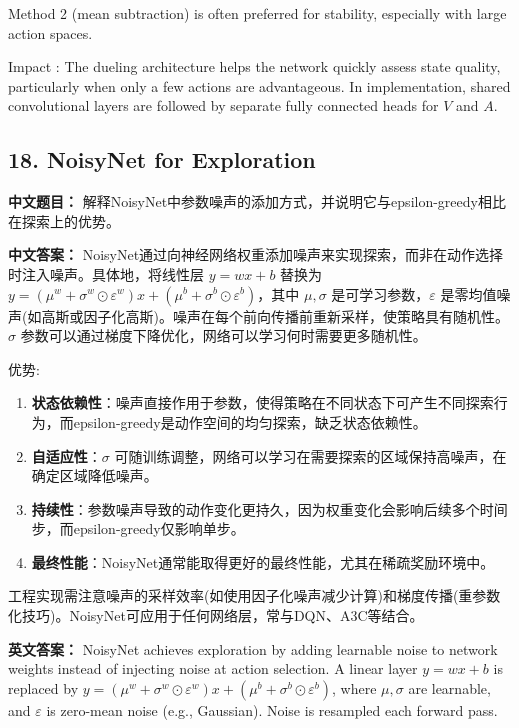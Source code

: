 \documentclass[10pt,a4paper]{ctexart}
\begin{document}
Method 2 (mean subtraction) is often preferred for stability, especially with large action spaces.

 Impact : The dueling architecture helps the network quickly assess state quality, particularly when only a few actions are advantageous. In implementation, shared convolutional layers are followed by separate fully connected heads for \(V\) and \(A\).

\subsection*{18. NoisyNet for Exploration}
\textbf{中文题目：} 解释NoisyNet中参数噪声的添加方式，并说明它与epsilon-greedy相比在探索上的优势。

\textbf{中文答案：}  
NoisyNet通过向神经网络权重添加噪声来实现探索，而非在动作选择时注入噪声。具体地，将线性层 \(y = wx + b\) 替换为 \(y = (\mu^w + \sigma^w \odot \varepsilon^w)x + (\mu^b + \sigma^b \odot \varepsilon^b)\)，其中 \(\mu, \sigma\) 是可学习参数，\(\varepsilon\) 是零均值噪声(如高斯或因子化高斯)。噪声在每个前向传播前重新采样，使策略具有随机性。\(\sigma\) 参数可以通过梯度下降优化，网络可以学习何时需要更多随机性。

 优势:
\begin{enumerate}
    \item \textbf{状态依赖性}：噪声直接作用于参数，使得策略在不同状态下可产生不同探索行为，而epsilon-greedy是动作空间的均匀探索，缺乏状态依赖性。
    \item \textbf{自适应性}：\(\sigma\) 可随训练调整，网络可以学习在需要探索的区域保持高噪声，在确定区域降低噪声。
    \item \textbf{持续性}：参数噪声导致的动作变化更持久，因为权重变化会影响后续多个时间步，而epsilon-greedy仅影响单步。
    \item \textbf{最终性能}：NoisyNet通常能取得更好的最终性能，尤其在稀疏奖励环境中。
\end{enumerate}

工程实现需注意噪声的采样效率(如使用因子化噪声减少计算)和梯度传播(重参数化技巧)。NoisyNet可应用于任何网络层，常与DQN、A3C等结合。

\textbf{英文答案：}  
NoisyNet achieves exploration by adding learnable noise to network weights instead of injecting noise at action selection. A linear layer \(y = wx + b\) is replaced by \(y = (\mu^w + \sigma^w \odot \varepsilon^w)x + (\mu^b + \sigma^b \odot \varepsilon^b)\), where \(\mu, \sigma\) are learnable, and \(\varepsilon\) is zero-mean noise (e.g., Gaussian). Noise is resampled each forward pass.
\end{document}
